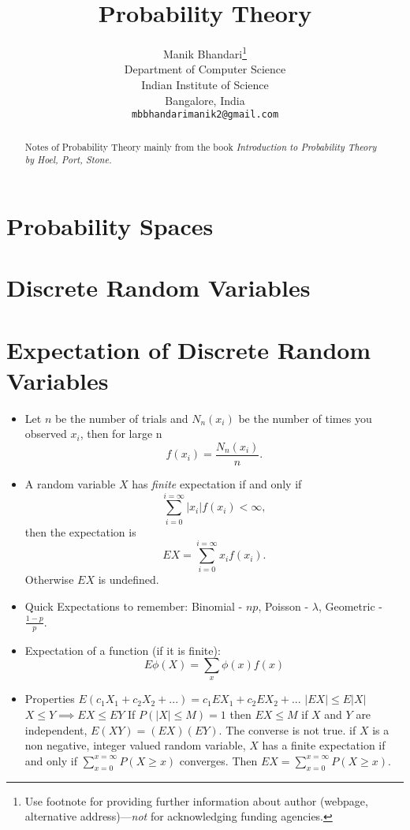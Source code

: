 \documentclass{article}
\title{Probability Theory}
\author{
	Manik Bhandari\thanks{Use footnote for providing further
		information about author (webpage, alternative
		address)---\emph{not} for acknowledging funding agencies.} \\
	Department of Computer Science\\
	Indian Institute of Science\\
	Bangalore, India \\
	\texttt{mbbhandarimanik2@gmail.com} \\
}
\begin{document}
	
	\maketitle
	
	\begin{abstract}
		Notes of Probability Theory mainly from the book \textit{Introduction to Probability Theory by Hoel, Port, Stone.}
	\end{abstract}
	
	\section{Probability Spaces}
	
	\section{Discrete Random Variables}
	
	\section{Expectation of Discrete Random Variables}
	\begin{itemize}
		\item Let $n$ be the number of trials and $N_n(x_i)$ be the number of times you observed $x_i$, then for large n \[f(x_i) = \frac{N_n(x_i)}{n}.\]
		\item A random variable $X$ has \textit{finite} expectation if and only if \[\sum_{i=0}^{i=\infty}|x_i|f(x_i) < \infty, \] then the expectation is \[EX = \sum_{i=0}^{i=\infty}x_if(x_i).\]
				Otherwise $EX$ is undefined.
		\item Quick Expectations to remember: Binomial - $np$, Poisson - $\lambda$, Geometric - $\frac{1-p}{p}$.
		\item Expectation of a function (if it is finite): \[E\phi(X) = \sum_{x}\phi(x)f(x)\]
		\item Properties
			\subitem $E(c_1X_1 + c_2X_2 + ...) = c_1EX_1 + c_2EX_2 + ...$
			\subitem $|EX| \leq E|X|$
			\subitem $X \leq Y \implies EX \leq EY$
			\subitem If $P(|X| \leq M) = 1$ then $EX \leq M$ 
			\subitem if $X$ and $Y$ are independent, $E(XY) = (EX)(EY)$. The converse is not true.
			\subitem if $X$ is a non negative, integer valued random variable, $X$ has a finite expectation if and only if $\sum_{x=0}^{x=\infty}P(X \geq x)$ converges. Then $EX = \sum_{x=0}^{x=\infty}P(X \geq x)$.
	\end{itemize}
	
\end{document}
